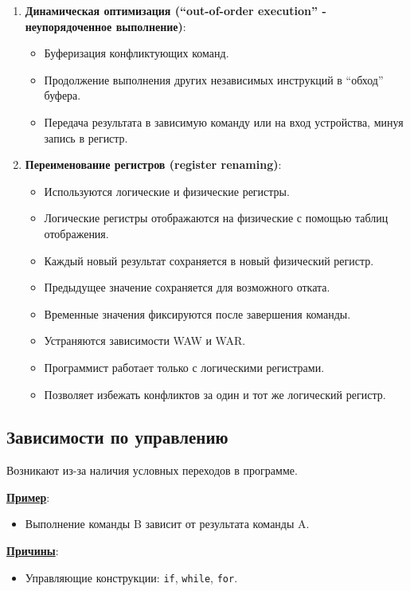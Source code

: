	\begin{enumerate}[start=3]
		\item \textbf{Динамическая оптимизация (``out-of-order execution'' - неупорядоченное выполнение)}:
		\begin{itemize}
			\item Буферизация конфликтующих команд.
			\item Продолжение выполнения других независимых инструкций в ``обход'' буфера.
			\item Передача результата в зависимую команду или на вход устройства, минуя запись в регистр.
		\end{itemize}
		\item \textbf{Переименование регистров (register renaming)}:
		\begin{itemize}
			\item Используются логические и физические регистры.
			\item Логические регистры отображаются на физические с помощью таблиц отображения.
			\item Каждый новый результат сохраняется в новый физический регистр.
			\item Предыдущее значение сохраняется для возможного отката.
			\item Временные значения фиксируются после завершения команды.
			\item Устраняются зависимости WAW и WAR.
			\item Программист работает только с логическими регистрами.
			\item Позволяет избежать конфликтов за один и тот же логический регистр.
		\end{itemize}
	\end{enumerate}
	
	\subsection{Зависимости по управлению}
	
	Возникают из-за наличия условных переходов в программе. 
	\par
	\textbf{\uline{Пример}}:
	
	\begin{itemize}
		\item Выполнение команды B зависит от результата команды A.
	\end{itemize}
	
	\textbf{\uline{Причины}}:
	
	\begin{itemize}
		\item Управляющие конструкции: \texttt{if}, \texttt{while}, \texttt{for}.
	\end{itemize}
	
